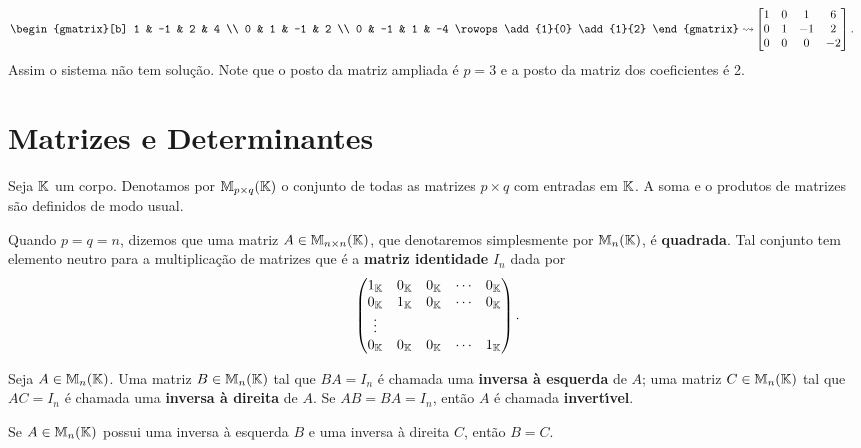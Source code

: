 \begin{exemplo}
\begin{enumerate}
\begin{solucao}
\begin{align*}
\begin{gmatrix}[b]
	1 & -1 & 2 & 4 \\
	0 & 1 & -1 & 2 \\
	0 & -1 & 1 & -4 
	\rowops
	\add{1}{0}
	\add{1}{2}
	\end{gmatrix}\leadsto&\begin{bmatrix}
	1 & 0 & 1 & 6 \\
	0 & 1 & -1 & 2 \\
	0 & 0 & 0 & -2 
	\end{bmatrix}.
	\end{align*}
	Assim o sistema n\~ao tem solu\c{c}\~ao. Note que o posto da matriz ampliada \'e $p = 3$ e a posto da matriz dos coeficientes \'e 2.
	\end{solucao}
\end{enumerate}
\end{exemplo}

\section{Matrizes e Determinantes}

Seja $\mathbb{K}$ um corpo. Denotamos por $\mathbb{M}_{p \times q}(\mathbb{K})$ o conjunto de todas as matrizes $p \times q$ com entradas em $\mathbb{K}$. A soma e o produtos de matrizes s\~ao definidos de modo usual.

Quando $p = q = n$, dizemos que uma matriz $A \in \mathbb{M}_{n \times n}(\mathbb{K})$, que denotaremos simplesmente por $\mathbb{M}_{n}(\mathbb{K})$, \'e \textbf{quadrada}.
Tal conjunto tem elemento neutro para a multiplica\c{c}\~ao de matrizes que \'e a \textbf{matriz identidade} $I_n$ dada por
\[
\begin{pmatrix}
1_{\mathbb{K}} & 0_{\mathbb{K}} & 0_{\mathbb{K}} & \cdots & 0_{\mathbb{K}}\\
0_{\mathbb{K}} & 1_{\mathbb{K}} & 0_{\mathbb{K}} & \cdots & 0_{\mathbb{K}}\\
\vdots\\
0_{\mathbb{K}} & 0_{\mathbb{K}} & 0_{\mathbb{K}} & \cdots & 1_{\mathbb{K}}
\end{pmatrix}.
\]

\begin{definicao}
Seja $A \in \mathbb{M}_{n}(\mathbb{K})$. Uma matriz $B \in \mathbb{M}_{n}(\mathbb{K})$ tal que $BA = I_n$ \'e chamada uma \textbf{inversa \`a esquerda} de $A$; uma matriz $C \in \mathbb{M}_{n}(\mathbb{K})$ tal que $AC = I_n$ \'e chamada uma \textbf{inversa \`a direita} de $A$. Se $AB = BA = I_n$, ent\~ao $A$ \'e chamada \textbf{invert{\'\i}vel}.
\end{definicao}

\begin{proposicao}
Se $A \in \mathbb{M}_{n}(\mathbb{K})$ possui uma inversa \`a esquerda $B$ e uma inversa \`a direita $C$, ent\~ao $B = C$.
\end{proposicao}

